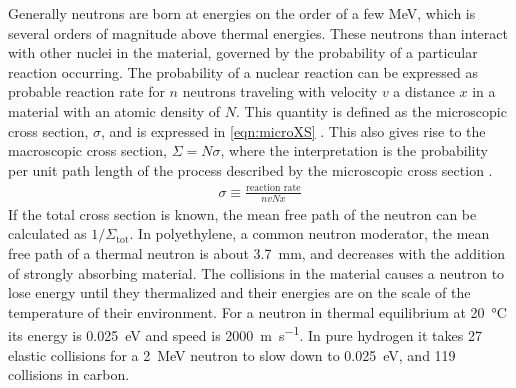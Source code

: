 Generally neutrons are born at energies on the order of a few MeV, which is several orders of magnitude above thermal energies.
These neutrons than interact with other nuclei in the material, governed by the probability of a particular reaction occurring.
The probability of a nuclear reaction can be expressed as probable reaction rate for $n$ neutrons traveling with velocity $v$ a distance $x$ in a material with an atomic density of $N$.
This quantity is  defined as the microscopic cross section, $\sigma$, and is expressed in \eqref{eqn:microXS} .
This also gives rise to the macroscopic cross section, $\Sigma=N\sigma$, where the interpretation is the probability per unit path length of the process described by the microscopic cross section \cite{stacey_nuclear_2001}.
\begin{align}
	\label{eqn:microXS}
	\sigma \equiv \frac{\text{reaction rate}}{nvNx}
\end{align}
If the total cross section is known, the mean free path of the neutron can be calculated as $1/\Sigma_\text{tot}$.
In polyethylene, a common neutron moderator, the mean free path of a thermal neutron is about \SI{3.7}{\mm}, and decreases with the addition of strongly absorbing material.
The collisions in the material causes a neutron to lose energy until they thermalized and their energies are on the scale of the temperature of their environment.
For a neutron in thermal equilibrium at \SI{20}{\degreeCelsius} its energy is \SI{0.025}{\eV} and speed is \SI{2000}{\m\per\second}.
In pure hydrogen it takes 27 elastic collisions for a \SI{2}{\MeV} neutron to slow down to \SI{0.025}{\electronvolt}, and 119 collisions in carbon.

